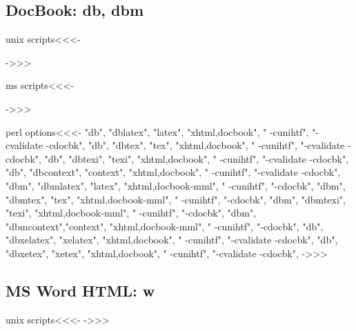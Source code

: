 \documentclass{article}
\begin{document}
\subsection{DocBook: db, dbm}

\<unix scripts\><<<-

->>>

\<ms scripts\><<<-

->>>



\<perl options\><<<-
 "db",  "dblatex",   "latex",   "xhtml,docbook",     " -cunihtf",  "-cvalidate -cdocbk",
 "db",  "dbtex",     "tex",     "xhtml,docbook",     " -cunihtf",  "-cvalidate -cdocbk",
 "db",  "dbtexi",    "texi",    "xhtml,docbook",     " -cunihtf",  "-cvalidate -cdocbk",
 "db",  "dbcontext", "context", "xhtml,docbook",     " -cunihtf",  "-cvalidate -cdocbk",
 "dbm", "dbmlatex",  "latex",   "xhtml,docbook-mml", " -cunihtf",  "-cdocbk",
 "dbm", "dbmtex",    "tex",     "xhtml,docbook-mml", " -cunihtf",  "-cdocbk",
 "dbm", "dbmtexi",   "texi",    "xhtml,docbook-mml", " -cunihtf",  "-cdocbk",
 "dbm", "dbmcontext","context", "xhtml,docbook-mml", " -cunihtf",  "-cdocbk",
 "db",  "dbxelatex",   "xelatex",   "xhtml,docbook",     " -cunihtf",  "-cvalidate -cdocbk",
 "db",  "dbxetex",     "xetex",     "xhtml,docbook",     " -cunihtf",  "-cvalidate -cdocbk",
->>>



\subsection{MS Word HTML: w}


\<unix scripts\><<<-
->>>
\end{document}
